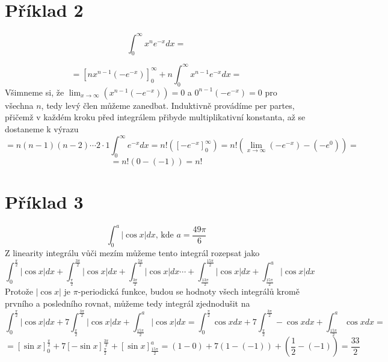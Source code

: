 \documentclass[11pt,a4paper]{article}
\begin{document}
\section*{Příklad 2}
$$
\int_0^\infty x^n e^{-x} dx =
$$
\begin{flushright}
[per partes: $u = x^n, v' = e^{-x}$]
\end{flushright}
$$
= \left[ nx^{n-1}(-e^{-x}) \right]_0^\infty + n\int_0^\infty x^{n-1}e^{-x} dx =
$$
Všimneme si, že $\lim_{x \to \infty} (x^{n-1}(-e^{-x})) = 0$ a $0^{n-1}(-e^{-x}) = 0$ pro všechna $n$, tedy levý člen můžeme zanedbat. Induktivně provádíme per partes, přičemž v každém kroku před integrálem přibyde multiplikativní konstanta, až se dostaneme k výrazu
$$
= n(n-1)(n-2)\cdots2 \cdot 1 \int_0^\infty e^{-x} dx = n!\left( \left[ -e^{-x} \right]_0^\infty \right)=n!\left( \lim_{x \to \infty} (-e^{-x}) - (-e^0) \right)=
$$
$$
= n!( 0 - (-1)) = n!
$$

\section*{Příklad 3}
$$
\int_0^a \vert \cos x \vert dx \text{, kde } a = \frac{49\pi}{6}
$$
Z linearity integrálu vůči mezím můžeme tento integrál rozepsat jako
$$
\int_0^{\frac{\pi}{2}} \vert \cos x \vert dx +
\int_{\frac{\pi}{2}}^{\frac{3\pi}{2}} \vert \cos x \vert dx +
\int_{\frac{3\pi}{2}}^{\frac{5\pi}{2}} \vert \cos x \vert dx \cdots + 
\int_{\frac{13\pi}{2}}^{\frac{15\pi}{2}} \vert \cos x \vert dx + 
\int_{\frac{15\pi}{2}}^a \vert \cos x \vert dx
$$
Protože $\vert \cos x \vert$ je $\pi$-periodická funkce, budou se hodnoty všech integrálů kromě prvního a posledního rovnat, můžeme tedy integrál zjednodušit na
$$
\int_0^\frac{\pi}{2} \vert \cos x \vert dx + 
7\int_\frac{\pi}{2}^\frac{3\pi}{2} \vert \cos x \vert dx +
\int_{\frac{15\pi}{2}}^a \vert \cos x \vert dx 
=
\int_0^\frac{\pi}{2} \cos x dx + 
7\int_\frac{\pi}{2}^\frac{3\pi}{2} -\cos x dx +
\int_{\frac{15\pi}{2}}^a \cos x dx =
$$
$$
= 
\left[ \sin x \right]_0^{\frac{\pi}{2}} +
7\left[-\sin x\right]_\frac{\pi}{2}^\frac{3\pi}{2} +
\left[ \sin x \right]_\frac{15\pi}{2}^a 
=
(1-0)+7(1-(-1))+(\frac{1}{2}-(-1))
= \frac{33}{2}
$$
\end{document}
